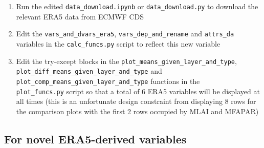 \begin{itemize}
\begin{enumerate}
		\item Run the edited \verb+data_download.ipynb+ or \verb+data_download.py+ to download the relevant \ac{ERA5} data from \ac{ECMWF} \ac{CDS}
		\item Edit the \verb+vars_and_dvars_era5+, \verb+vars_dep_and_rename+ and \verb+attrs_da+ variables in the \verb+calc_funcs.py+ script to reflect this new variable
		\item Edit the try-except blocks in the \verb+plot_means_given_layer_and_type+, \verb+plot_diff_means_given_layer_and_type+ and \\ \verb+plot_comp_means_given_layer_and_type+ functions in the \\ \verb+plot_funcs.py+ script so that a total of 6 \ac{ERA5} variables will be displayed at all times (this is an unfortunate design constraint from displaying 8 rows for the comparison plots with the first 2 rows occupied by \ac{MLAI} and \ac{MFAPAR})
	\end{enumerate}
\end{itemize}

\subsection{For novel ERA5-derived variables}

